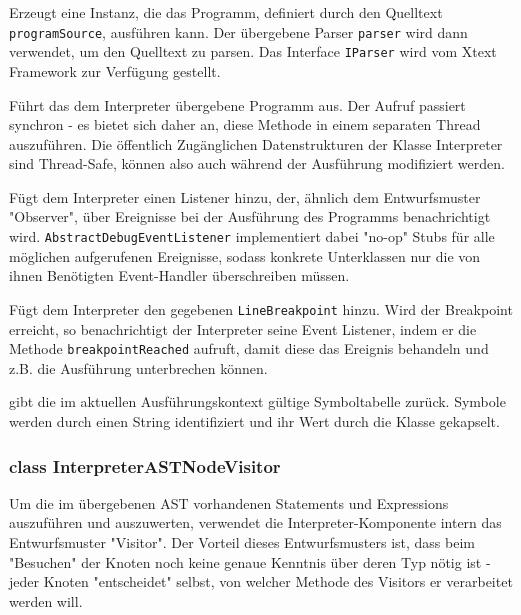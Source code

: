 \begin{description}
    Erzeugt eine Instanz, die das Programm, definiert durch den Quelltext \texttt{programSource}, ausführen kann. Der übergebene Parser \texttt{parser} wird dann verwendet, um den Quelltext zu parsen. Das Interface \texttt{IParser} wird vom Xtext Framework zur Verfügung gestellt.

    Führt das dem Interpreter übergebene Programm aus. Der Aufruf passiert synchron - es bietet sich daher an, diese Methode in einem separaten Thread auszuführen. Die öffentlich Zugänglichen Datenstrukturen der Klasse Interpreter sind Thread-Safe, können also auch während der Ausführung modifiziert werden.

    Fügt dem Interpreter einen Listener hinzu, der, ähnlich dem Entwurfsmuster "Observer", über Ereignisse bei der Ausführung des Programms benachrichtigt wird. \texttt{AbstractDebugEventListener} implementiert dabei "no-op" Stubs für alle möglichen aufgerufenen Ereignisse, sodass konkrete Unterklassen nur die von ihnen Benötigten Event-Handler überschreiben müssen.


    Fügt dem Interpreter den gegebenen \texttt{LineBreakpoint} hinzu. Wird der Breakpoint erreicht, so benachrichtigt der Interpreter seine Event Listener, indem er die Methode \texttt{breakpointReached} aufruft, damit diese das Ereignis behandeln und z.B. die Ausführung unterbrechen können.

     gibt die im aktuellen Ausführungskontext gültige Symboltabelle zurück. Symbole werden durch einen String identifiziert und ihr Wert durch die Klasse  gekapselt.
\end{description}

\subsubsection{class InterpreterASTNodeVisitor}
Um die im übergebenen AST vorhandenen Statements und Expressions auszuführen und auszuwerten, verwendet die Interpreter-Komponente intern das Entwurfsmuster "Visitor". Der Vorteil dieses Entwurfsmusters ist, dass beim "Besuchen" der Knoten noch keine genaue Kenntnis über deren Typ nötig ist - jeder Knoten "entscheidet" selbst, von welcher Methode des Visitors er verarbeitet werden will.

